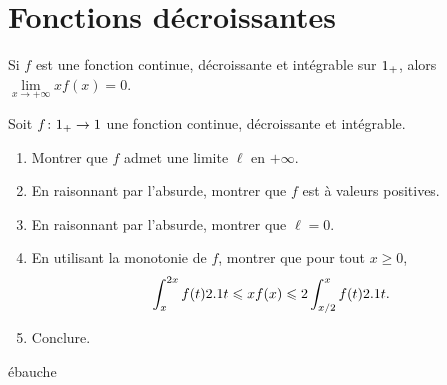 \section{Fonctions décroissantes}




\begin{prop}
Si $f$ est une fonction continue, décroissante et intégrable sur $\R_+$, alors $\lim\limits_{x\to+\infty} x f(x) = 0$.
\end{prop}

\begin{exercice}
Soit $\fonctionens[f]{\Rp}{\R}$ une fonction continue, décroissante et intégrable.
\begin{enumerate}
\item Montrer que $f$ admet une limite $\ell$ en $+\infty$.

\item En raisonnant par l'absurde, montrer que $f$ est à valeurs positives.

\item En raisonnant par l'absurde, montrer que $\ell = 0$.

\item En utilisant la monotonie de $f$, montrer que pour tout $x \geq 0$,
\[
\int_x^{2 x} f(t) \d t \leqslant x f(x) \leqslant 2 \int_{x/2}^x f(t) \d t.
\]

\item Conclure.
\end{enumerate}
\end{exercice}

\begin{marginfigure}[-2cm]
    \centering
    
    \caption{ébauche}
\end{marginfigure}

